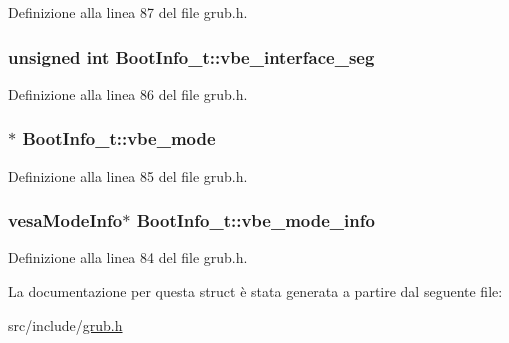 Definizione alla linea 87 del file grub.\+h.

\hypertarget{structBootInfo__t_a878cf7a1a61c7b7d21b704feee0fcc60}{
\subsubsection[{vbe\+\_\+interface\+\_\+seg}]{\setlength{\rightskip}{0pt plus 5cm}unsigned int Boot\+Info\+\_\+t\+::vbe\+\_\+interface\+\_\+seg}}\label{structBootInfo__t_a878cf7a1a61c7b7d21b704feee0fcc60}


Definizione alla linea 86 del file grub.\+h.

\hypertarget{structBootInfo__t_a55a278b70ee059fd245f08f3293440d9}{
\subsubsection[{vbe\+\_\+mode}]{$\ast$ Boot\+Info\+\_\+t\+::vbe\+\_\+mode}}\label{structBootInfo__t_a55a278b70ee059fd245f08f3293440d9}


Definizione alla linea 85 del file grub.\+h.

\hypertarget{structBootInfo__t_ad583d2ecbdc34a87c6ab29a2fded69b6}{
\subsubsection[{vbe\+\_\+mode\+\_\+info}]{\setlength{\rightskip}{0pt plus 5cm}vesa\+Mode\+Info$\ast$ Boot\+Info\+\_\+t\+::vbe\+\_\+mode\+\_\+info}}\label{structBootInfo__t_ad583d2ecbdc34a87c6ab29a2fded69b6}


Definizione alla linea 84 del file grub.\+h.



La documentazione per questa struct è stata generata a partire dal seguente file\+:\begin{DoxyCompactItemize}
\item 
src/include/\hyperlink{grub_8h}{grub.\+h}\end{DoxyCompactItemize}
